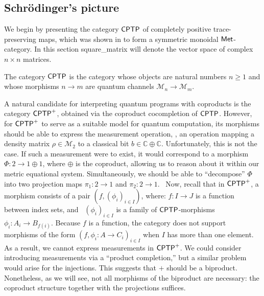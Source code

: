 \subsection{Schrödinger's picture}

We begin by presenting the category $\mathsf{CPTP}$ of completely positive trace-preserving maps, which was shown in \cite{dahlqvist2023syntactic} to form a symmetric monoidal $\mathsf{Met}$-category. In this section \gls{square_matrix} will denote the vector space of complex $n\times n$ matrices.




\begin{definition} \label{ex:cat_cptp}
The category $\mathsf{CPTP}$ is the category whose objects are natural numbers $n \geq 1$ and whose morphisms $n \rightarrow m$ are quantum channels $\mathcal{M}_n \rightarrow \mathcal{M}_m$.
\end{definition}


A natural candidate for interpreting quantum programs with coproducts is the category $\mathsf{CPTP}^+$, obtained via the coproduct cocompletion of $\mathsf{CPTP}$. However, for $\mathsf{CPTP}^+$ to serve as a suitable model for quantum computation, its morphisms should be able to express the measurement operation, \ie, an operation mapping a density matrix $\rho \in \mathcal{M}_2$ to a classical bit $b \in \mathbb{C} \oplus \mathbb{C}$. 
Unfortunately, this is not the case. 
If such a measurement were to exist, it would correspond to a morphism $\Phi \colon 2 \to 1 \oplus 1$, where $\oplus$ is the coproduct, allowing us to reason about it within our metric equational system. Simultaneously, we should be able to ``decompose'' $\Phi$ into two projection maps $\pi_1 \colon 2 \to 1$ and $\pi_2 \colon 2 \to 1$.  Now, recall that in $\mathsf{CPTP}^+$, a morphism consists of a pair $(f, (\phi_i)_{i \in I})$, where: $f \colon I \to J$ is a function between index sets, and
 $(\phi_i)_{i \in I}$ is a family of $\mathsf{CPTP}$-morphisms $\phi_i \colon A_i \to B_{f(i)}$. Because $f$ is a function, the category does not support morphisms of the form $(f,\phi_i \colon A \to C_i)_{i \in I}$ when $I$ has more than one element. As a result,  we cannot express measurements in $\mathsf{CPTP}^+$. We could consider introducing measurements via a ``product completion,'' but a similar problem would arise for the injections. 
This suggests that \( + \) should be a biproduct. Nonetheless, as we will see, not all morphisms of the biproduct are necessary: the coproduct structure together with the projections suffices.

